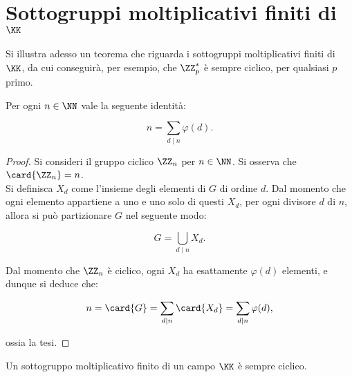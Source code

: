 \section{Sottogruppi moltiplicativi finiti di \texorpdfstring{$\KK$}{K}}

Si illustra adesso un teorema che riguarda i sottogruppi
moltiplicativi finiti di $\KK$, da cui conseguirà,
per esempio, che $\ZZ_p^*$ è sempre ciclico, per
qualsiasi $p$ primo. \\

\begin{lemma}
    \label{lem:somma_phi_n}
    Per ogni $n \in \NN$ vale la seguente identità:

    \[ n = \sum_{d \mid n} \varphi(d). \]
\end{lemma}

\begin{proof}
    Si consideri il gruppo ciclico $\ZZ_n$ per $n \in \NN$.
    Si osserva che $\card{\ZZ_n} = n$. \\

    Si definisca $X_d$ come l'insieme degli elementi di $G$
    di ordine $d$. Dal momento che ogni elemento appartiene
    a uno e uno solo di questi $X_d$, per ogni divisore
    $d$ di $n$, allora si può partizionare $G$ nel
    seguente modo:

    \begin{equation*}
        G = \bigcup_{d \mid n} X_d.
    \end{equation*}

    Dal momento che $\ZZ_n$ è ciclico, ogni $X_d$ ha esattamente
    $\varphi(d)$ elementi, e dunque si deduce che:

    \begin{equation*}
        n = \card{G} = \sum_{d \mid n} \card{X_d} =  \sum_{d \mid n} \varphi(d),
    \end{equation*}

    ossia la tesi.
\end{proof}

\begin{theorem}
    Un sottogruppo moltiplicativo finito di un campo
    $\KK$ è sempre ciclico.
\end{theorem}

